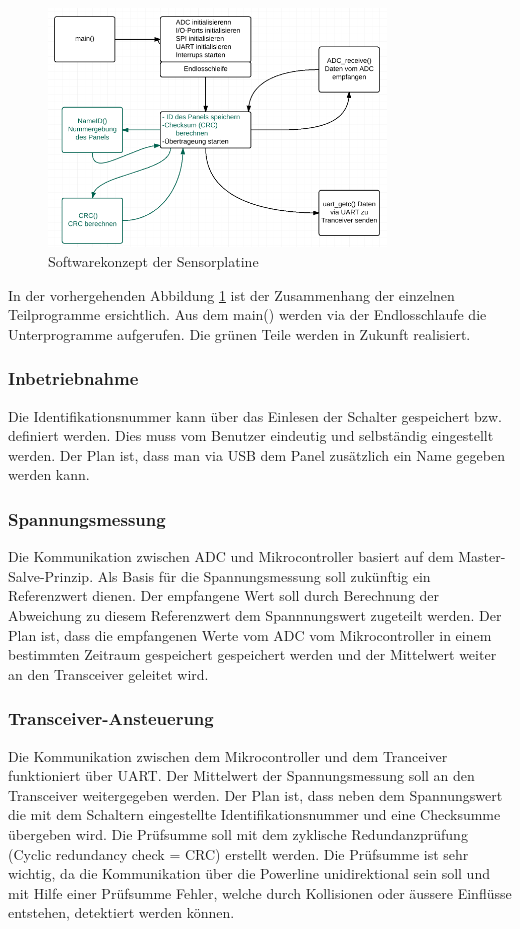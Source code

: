 \begin{figure}[htb]
\centering
\includegraphics[width=0.8\textwidth]{sections/data/Sensorplatine}
\caption{Softwarekonzept der Sensorplatine}
\label{DiagrammSP}
\end{figure}

In der vorhergehenden Abbildung \ref{DiagrammSP} ist der Zusammenhang der einzelnen Teilprogramme ersichtlich. Aus dem main() werden via der Endlosschlaufe die Unterprogramme aufgerufen. Die grünen Teile werden in Zukunft realisiert.
\subsubsection{Inbetriebnahme}
Die Identifikationsnummer kann über das Einlesen der Schalter gespeichert bzw. definiert werden. Dies muss vom Benutzer eindeutig und selbständig eingestellt werden. Der Plan ist, dass man via USB dem Panel zusätzlich ein Name gegeben werden kann.
\subsubsection{Spannungsmessung}
Die Kommunikation zwischen ADC und Mikrocontroller basiert auf dem Master-Salve-Prinzip. 
Als Basis für die Spannungsmessung soll zukünftig ein Referenzwert dienen. Der empfangene Wert soll durch Berechnung der Abweichung zu diesem Referenzwert dem Spannnungswert zugeteilt werden. Der Plan ist, dass die empfangenen Werte vom ADC vom Mikrocontroller in einem bestimmten Zeitraum gespeichert gespeichert werden und der Mittelwert weiter an den Transceiver geleitet wird.

\subsubsection{Transceiver-Ansteuerung}
Die Kommunikation zwischen dem Mikrocontroller und dem Tranceiver funktioniert über UART. 
Der Mittelwert der Spannungsmessung soll an den Transceiver weitergegeben werden. Der Plan ist, dass neben dem Spannungswert die mit dem Schaltern eingestellte Identifikationsnummer und eine Checksumme übergeben wird. Die Prüfsumme soll mit dem zyklische Redundanzprüfung (Cyclic redundancy check = CRC)  erstellt werden. Die Prüfsumme ist sehr wichtig, da die Kommunikation über die Powerline unidirektional sein soll und  mit Hilfe einer Prüfsumme Fehler, welche durch Kollisionen oder äussere Einflüsse entstehen, detektiert werden können.\\
